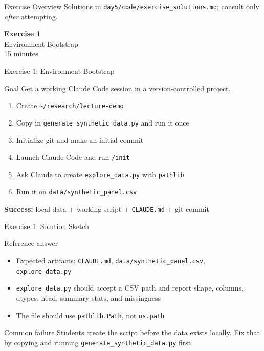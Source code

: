 \documentclass[aspectratio=169,10pt]{beamer}
\begin{document}
\begin{frame}{Exercise Overview}
\vspace{0.2em}
{\tiny Solutions in \texttt{day5/code/exercise\_solutions.md}; consult only \emph{after} attempting.}
\end{frame}

\begin{frame}{}
\vfill\begin{center}{\Huge \textcolor{uzhblue}{\textbf{Exercise 1}}}\\[12pt]
{\LARGE Environment Bootstrap}\\[6pt]{\small 15 minutes}\end{center}\vfill
\end{frame}

\begin{frame}[fragile]{Exercise 1: Environment Bootstrap}
\begin{exampleblock}{Goal}
Get a working Claude Code session in a version-controlled project.
\end{exampleblock}
\small
\begin{enumerate}\itemsep1pt
    \item Create \texttt{\~{}/research/lecture-demo}
    \item Copy in \texttt{generate\_synthetic\_data.py} and run it once
    \item Initialize git and make an initial commit
    \item Launch Claude Code and run \texttt{/init}
    \item Ask Claude to create \texttt{explore\_data.py} with \texttt{pathlib}
    \item Run it on \texttt{data/synthetic\_panel.csv}
\end{enumerate}

\textbf{Success:} local data + working script + \texttt{CLAUDE.md} + git commit
\end{frame}

\begin{frame}{Exercise 1: Solution Sketch}
\small
\begin{exampleblock}{Reference answer}
\begin{itemize}\itemsep2pt
    \item Expected artifacts: \texttt{CLAUDE.md}, \texttt{data/synthetic\_panel.csv}, \texttt{explore\_data.py}
    \item \texttt{explore\_data.py} should accept a CSV path and report shape, columns, dtypes, head, summary stats, and missingness
    \item The file should use \texttt{pathlib.Path}, not \texttt{os.path}
\end{itemize}
\end{exampleblock}

\begin{alertblock}{Common failure}
Students create the script before the data exists locally. Fix that by copying
and running \texttt{generate\_synthetic\_data.py} first.
\end{alertblock}
\end{frame}
\end{document}
